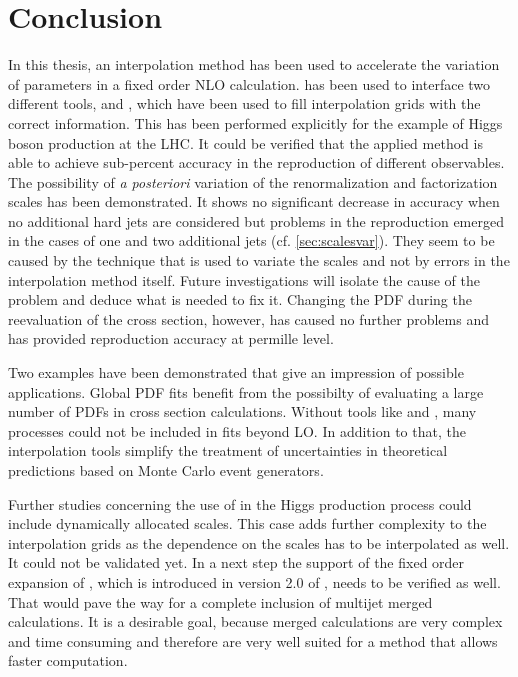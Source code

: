 
\chapter{Conclusion}
In this thesis, an interpolation method has been used to accelerate the variation of parameters in a fixed order NLO calculation.
\mcgrid{} has been used to interface two different tools, \appl{} and \fnlo{}, which have been used to fill interpolation grids with the correct information.
This has been performed explicitly for the example of Higgs boson production at the LHC.
It could be verified that the applied method is able to achieve sub-percent accuracy in the reproduction of different observables.
The possibility of \textit{a posteriori} variation of the renormalization and factorization scales has been demonstrated.
It shows no significant decrease in accuracy when no additional hard jets are considered but problems in the reproduction emerged in the cases of one and two additional jets (cf. \cref{sec:scalesvar}).
They seem to be caused by the technique that is used to variate the scales and not by errors in the interpolation method itself.
Future investigations will isolate the cause of the problem and deduce what is needed to fix it.
Changing the PDF during the reevaluation of the cross section, however, has caused no further problems and has provided reproduction accuracy at permille level.

Two examples have been demonstrated that give an impression of possible applications.
Global PDF fits benefit from the possibilty of evaluating a large number of PDFs in cross section calculations.
Without tools like \appl{} and \fnlo{}, many processes could not be included in fits beyond LO.
In addition to that, the interpolation tools simplify the treatment of uncertainties in theoretical predictions based on Monte Carlo event generators.

Further studies concerning the use of \mcgrid{} in the Higgs production process could include dynamically allocated scales.
This case adds further complexity to the interpolation grids as the dependence on the scales has to be interpolated as well.
It could not be validated yet.
In a next step the support of the fixed order expansion of \mcatnlo, which is introduced in version 2.0 of \mcgrid{}, needs to be verified as well.
That would pave the way for a complete inclusion of multijet merged calculations.
It is a desirable goal, because merged calculations are very complex and time consuming and therefore are very well suited for a method that allows faster computation.
%

